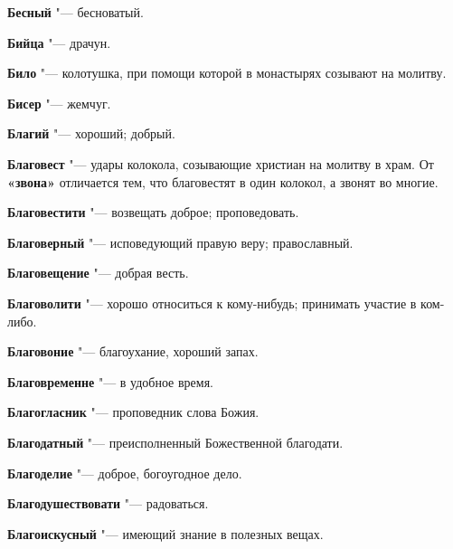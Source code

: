 \begin{mymulticols}{2}
\noindent\textbf{Бесный} "--- бесноватый. 




\noindent\textbf{Бийца} "--- драчун. 




\noindent\textbf{Било} "--- колотушка, при помощи которой в монастырях созывают на молитву. 




\noindent\textbf{Бисер} "--- жемчуг. 




\noindent\textbf{Благий} "--- хороший; добрый. 




\noindent\textbf{Благовест} "--- удары колокола, созывающие христиан на молитву в храм. От \textbf{«звона»} отличается тем, что благовестят в один колокол, а звонят во многие. 



\noindent\textbf{Благовестити} "--- возвещать доброе; проповедовать. 




\noindent\textbf{Благоверный} "--- исповедующий правую веру; православный. 




\noindent\textbf{Благовещение} "--- добрая весть. 




\noindent\textbf{Благоволити} "--- хорошо относиться к кому-нибудь; принимать участие в ком-либо. 




\noindent\textbf{Благовоние} "--- благоухание, хороший запах. 




\noindent\textbf{Благовременне} "--- в удобное время. 




\noindent\textbf{Благогласник} "--- проповедник слова Божия. 




\noindent\textbf{Благодатный} "--- преисполненный Божественной благодати. 




\noindent\textbf{Благоделие} "--- доброе, богоугодное дело. 




\noindent\textbf{Благодушествовати} "--- радоваться. 




\noindent\textbf{Благоискусный} "--- имеющий знание в полезных вещах. 





\end{mymulticols}
